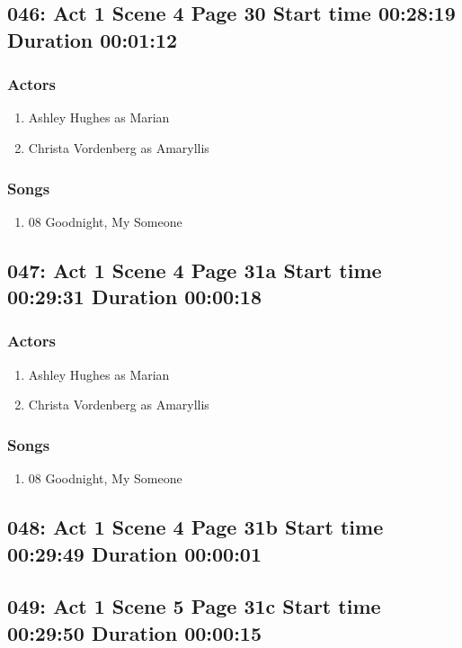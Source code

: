 \subsection{046: Act 1 Scene 4 Page 30 Start time 00:28:19 Duration 00:01:12}

\subsubsection{Actors}
\begin{enumerate}
\item Ashley Hughes as Marian
\item Christa Vordenberg as Amaryllis
\end{enumerate}

\subsubsection{Songs}
\begin{enumerate}
\item 08 Goodnight, My Someone
\end{enumerate}
\subsection{047: Act 1 Scene 4 Page 31a Start time 00:29:31 Duration 00:00:18}

\subsubsection{Actors}
\begin{enumerate}
\item Ashley Hughes as Marian
\item Christa Vordenberg as Amaryllis
\end{enumerate}

\subsubsection{Songs}
\begin{enumerate}
\item 08 Goodnight, My Someone
\end{enumerate}
\subsection{048: Act 1 Scene 4 Page 31b Start time 00:29:49 Duration 00:00:01}

\subsection{049: Act 1 Scene 5 Page 31c Start time 00:29:50 Duration 00:00:15}

